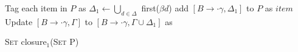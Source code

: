 \documentclass{standalone}
\begin{document}
    \begin{algorithm}[H]
        \label{alg:lr1-closure}
        \DontPrintSemicolon

        

        Tag each item in \(P\) as \UnMk \;
         {
            \;
             {
                \(\Delta_1 \leftarrow \bigcup_{d \in \Delta}\) first(\(\beta d\)) \;
                 {
                     {
                        add \([B \to \cdot \gamma, \Delta_1]\) to \(P\) as \UnMk \(item\)\;
                    }
                    {
                         {
                            Update \([B \to \cdot \gamma, \Gamma]\) to \([B \to \cdot \gamma, \Gamma \cup \Delta_1]\) as \UnMk \;
                        }
                    }
                }
            }
        }

        \caption{\textsc{Set} closure\(_1\)(\textsc{Set} P)}
    \end{algorithm}
\end{document}
